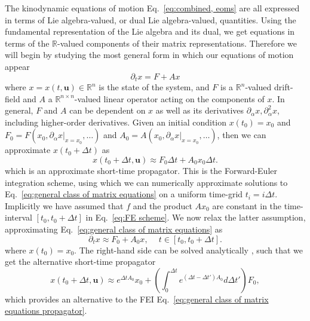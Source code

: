 The kinodynamic equations of motion Eq.~\ref{eq:combined, eoms} are all expressed in terms of Lie algebra-valued, or dual Lie algebra-valued, quantities. Using the fundamental representation of the Lie algebra and its dual, we get equations in terms of the $\mathbb{R}$-valued components of their matrix representations. Therefore we will begin by studying the most general form in which our equations of motion appear
\begin{equation} \label{eq:general class of matrix equations}
\partial_t x = F + A x
\end{equation}
where $x = x(t,\mathbf{u}) \in \mathbb{R}^n$ is the state of the system, and $F$ is a $\mathbb{R}^n$-valued drift-field and $A$ a $\mathbb{R}^{n \times n}$-valued linear operator acting on the components of $x$. In general, $F$ and $A$ can be dependent on $x$ as well as its derivatives $\partial_\alpha x, \partial^2_\alpha x$, including higher-order derivatives. Given an initial condition $x(t_0) = x_0$ and $F_0 = F(x_0, \partial_\alpha x |_{x = x_0}, \dots)$ and $A_0 = A(x_0, \partial_\alpha x |_{x = x_0}, \dots)$, then we can approximate $x(t_0 + \Delta t)$ as
\begin{equation} \label{eq:FE scheme}
	x(t_0 + \Delta t, \mathbf{u}) \approx F_0 \Delta t + A_0 x_0 \Delta t.
\end{equation}
which is an approximate short-time propagator. This is the Forward-Euler integration scheme, using which we can numerically approximate solutions to Eq.~\ref{eq:general class of matrix equations} on a uniform time-grid $t_i = i \Delta t$. Implicitly we have assumed that $f$ and the product $A x_0$ are constant in the time-interval $[t_0, t_0 + \Delta t]$ in Eq.~\ref{eq:FE scheme}. We now relax the latter assumption, approximating Eq.~\ref{eq:general class of matrix equations} as
\begin{equation} \label{eq:general class of matrix equations propagator}
\partial_t x \approx F_0 + A_0 x,\ \quad t \in [t_0, t_0 + \Delta t].
\end{equation}
where $x(t_0) = x_0$. The right-hand side can be solved analytically \citep{haleOrdinaryDifferentialEquations2009}, such that we get the alternative short-time propagator
\begin{equation} \label{eq:general lie group integrator}
	x(t_0 + \Delta t, \mathbf{u}) \approx e^{\Delta t A_0} x_0 + \left( \int_0^{\Delta t} e^{(\Delta t - \Delta t') A_0} d \Delta t' \right) F_0,
\end{equation}
which provides an alternative to the FEI Eq.~\ref{eq:general class of matrix equations propagator}.

